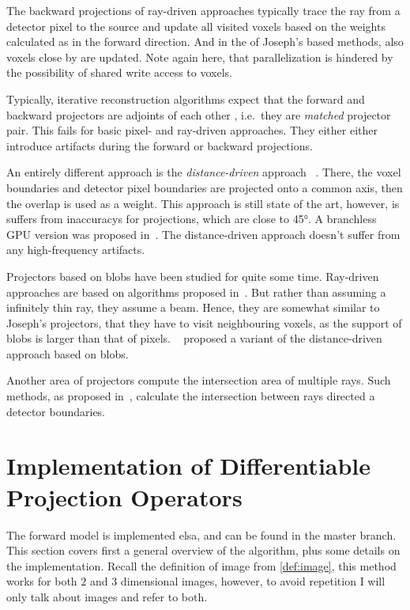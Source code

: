 The backward projections of ray-driven approaches typically trace the ray from a detector pixel to
the source and update all visited voxels based on the weights calculated as in the forward
direction. And in the of Joseph's based methods, also voxels close by are updated. Note again here,
that parallelization is hindered by the possibility of shared write access to voxels.

Typically, iterative reconstruction algorithms expect that the forward and backward projectors are
adjoints of each other , i.e.\ they are
\textit{matched} projector pair. This fails for basic pixel- and ray-driven approaches.
They either either introduce artifacts during the forward or backward projections.

An entirely different approach is the \textit{distance-driven} approach
~\cite{de_man_distance-driven_2002, de_man_distance-driven_2004}. There, the voxel boundaries and
detector pixel boundaries are projected onto a common axis, then the overlap is used as a weight.
This approach is still state of the art, however, is suffers from inaccuracys for projections, which
are close to 45°. A branchless \gls{GPU} version was proposed in~\cite{liu_gpu-based_2017}. The
distance-driven approach doesn't suffer from any high-frequency artifacts.

Projectors based on blobs have been studied for quite some time. Ray-driven approaches are based on
algorithms proposed in~\cite{matej_practical_1996, popescu_ray_2004}. But rather than assuming a
infinitely thin ray, they assume a beam. Hence, they are somewhat similar to Joseph's projectors,
that they have to visit neighbouring voxels, as the support of blobs is larger than that of pixels.
~\cite{levakhina_distance-driven_2010} proposed a variant of the distance-driven approach based on
blobs.

Another area of projectors compute the intersection area of multiple rays. Such methods, as proposed
in~\cite{ha_study_2015, ha_efficient_2016, ha_look-up_2018}, calculate the intersection between rays
directed a detector boundaries.

\section{Implementation of Differentiable Projection Operators}\label{sec:implementation}

The forward model is implemented elsa, and can be found in the master branch. This section covers
first a general overview of the algorithm, plus some details on the implementation. Recall the
definition of image from \autoref{def:image}, this method works for both \(2\) and \(3\) dimensional
images, however, to avoid repetition I will only talk about images and refer to both.

